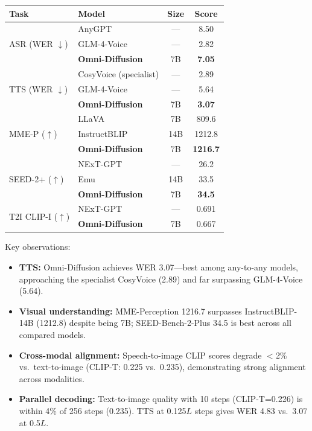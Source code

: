 \documentclass[11pt]{article}
\begin{document}
\begin{table}[h]
\centering
\small
\begin{tabular}{llcc}
\toprule
\textbf{Task} & \textbf{Model} & \textbf{Size} & \textbf{Score} \\
\midrule
\multirow{3}{*}{ASR (WER $\downarrow$)} & AnyGPT & --- & 8.50 \\
& GLM-4-Voice & --- & 2.82 \\
& \textbf{Omni-Diffusion} & 7B & \textbf{7.05} \\
\midrule
\multirow{3}{*}{TTS (WER $\downarrow$)} & CosyVoice (specialist) & --- & 2.89 \\
& GLM-4-Voice & --- & 5.64 \\
& \textbf{Omni-Diffusion} & 7B & \textbf{3.07} \\
\midrule
\multirow{3}{*}{MME-P ($\uparrow$)} & LLaVA & 7B & 809.6 \\
& InstructBLIP & 14B & 1212.8 \\
& \textbf{Omni-Diffusion} & 7B & \textbf{1216.7} \\
\midrule
\multirow{3}{*}{SEED-2+ ($\uparrow$)} & NExT-GPT & --- & 26.2 \\
& Emu & 14B & 33.5 \\
& \textbf{Omni-Diffusion} & 7B & \textbf{34.5} \\
\midrule
\multirow{2}{*}{T2I CLIP-I ($\uparrow$)} & NExT-GPT & --- & 0.691 \\
& \textbf{Omni-Diffusion} & 7B & 0.667 \\
\bottomrule
\end{tabular}
\end{table}

\noindent Key observations:
\begin{itemize}
    \item \textbf{TTS:} Omni-Diffusion achieves WER 3.07---best among any-to-any models, approaching the specialist CosyVoice (2.89) and far surpassing GLM-4-Voice (5.64).
    \item \textbf{Visual understanding:} MME-Perception 1216.7 surpasses InstructBLIP-14B (1212.8) despite being 7B; SEED-Bench-2-Plus 34.5 is best across all compared models.
    \item \textbf{Cross-modal alignment:} Speech-to-image CLIP scores degrade $<$2\% vs.\ text-to-image (CLIP-T: 0.225 vs.\ 0.235), demonstrating strong alignment across modalities.
    \item \textbf{Parallel decoding:} Text-to-image quality with 10 steps (CLIP-T=0.226) is within 4\% of 256 steps (0.235). TTS at 0.125$L$ steps gives WER 4.83 vs.\ 3.07 at 0.5$L$.
\end{itemize}
\end{document}
